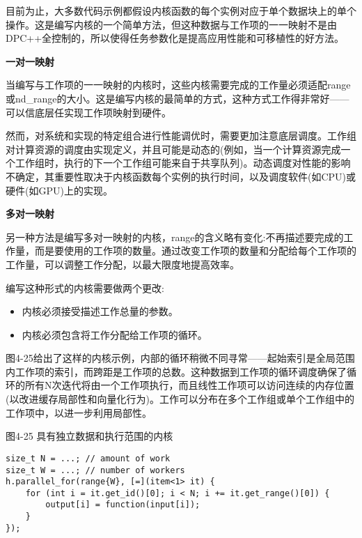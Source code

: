目前为止，大多数代码示例都假设内核函数的每个实例对应于单个数据块上的单个操作。这是编写内核的一个简单方法，但这种数据与工作项的一一映射不是由DPC++全控制的，所以使得任务参数化是提高应用性能和可移植性的好方法。\par

\hspace*{\fill} \par %
\textbf{一对一映射}

当编写与工作项的一一映射的内核时，这些内核需要完成的工作量必须适配range或nd\_range的大小。这是编写内核的最简单的方式，这种方式工作得非常好——可以信底层任实现工作项映射到硬件。\par

然而，对系统和实现的特定组合进行性能调优时，需要更加注意底层调度。工作组对计算资源的调度由实现定义，并且可能是动态的(例如，当一个计算资源完成一个工作组时，执行的下一个工作组可能来自于共享队列)。动态调度对性能的影响不确定，其重要性取决于内核函数每个实例的执行时间，以及调度软件(如CPU)或硬件(如GPU)上的实现。\par

\hspace*{\fill} \par %
\textbf{多对一映射}

另一种方法是编写多对一映射的内核，range的含义略有变化:不再描述要完成的工作量，而是要使用的工作项的数量。通过改变工作项的数量和分配给每个工作项的工作量，可以调整工作分配，以最大限度地提高效率。\par

编写这种形式的内核需要做两个更改:\par

\begin{itemize}
	\item 内核必须接受描述工作总量的参数。
	\item 内核必须包含将工作分配给工作项的循环。
\end{itemize}

图4-25给出了这样的内核示例，内部的循环稍微不同寻常——起始索引是全局范围内工作项的索引，而跨距是工作项的总数。这种数据到工作项的循环调度确保了循环的所有N次迭代将由一个工作项执行，而且线性工作项可以访问连续的内存位置(以改进缓存局部性和向量化行为)。工作可以分布在多个工作组或单个工作组中的工作项中，以进一步利用局部性。\par

\hspace*{\fill} \par %
图4-25 具有独立数据和执行范围的内核
\begin{lstlisting}[caption={}]
size_t N = ...; // amount of work
size_t W = ...; // number of workers
h.parallel_for(range{W}, [=](item<1> it) {
	for (int i = it.get_id()[0]; i < N; i += it.get_range()[0]) {
		output[i] = function(input[i]);
	}
});
\end{lstlisting}

